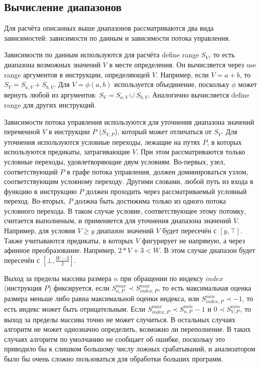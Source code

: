 \subsection{Вычисление диапазонов}

Для расчёта описанных выше диапазонов рассматриваются два вида
зависимостей: зависимости по данным и зависимости потока управления.

Зависимости по данным используются для расчёта define range $S_V$, то
есть диапазона возможных значений $V$ в месте определения. Он
вычисляется через use range аргументов в инструкции, определяющей
$V$. Например, если $V = a + b$, то $S_V = S_{a, V} + S_{b, V}$. Для
$V = \phi(a, b)$ используется объединение, поскольку $\phi$ может
вернуть любой из аргументов: $S_V = S_{a, V} \cup S_{b, V}$. Аналогично
вычисляется define range для других инструкций.

Зависимости потока управления используются для уточнения диапазона
значений переменной $V$ в инструкции $P$ ($S_{V, P}$), который может
отличаться от $S_V$. Для уточнения используются условные переходы,
лежащие на путях $P$, в которых используются предикаты, затрагивающие
$V$. При этом рассматриваются только условные переходы,
удовлетворяющие двум условиям. Во-первых, узел, соответствующий $P$ в
графе потока управления, должен доминироваться узлом, соответствующим
условному переходу. Другими словами, любой путь из входа в функцию в
инструкцию $P$ должен проходить через рассматриваемый условный
переход. Во-вторых, $P$ должна быть достижима только из одного потока
условного перехода. В таком случае условие, соответствующее этому
потомку, считается выполненым, и применяется для уточнения диапазона
значений $V$. Например, для условия $V \geq y$ диапазон значений $V$
будет пересечён с $[y, \top]$. Также учитываются предикаты, в которых
$V$ фигурирует не напрямую, а через афинное преобразование. Например,
$2 * V + 3 < W$. В этом случае диапазон будет пересечён с $[\bot,
\frac{W - 3}{2}]$.

Выход за пределы массива размера $n$ при обращении по индексу $index$
(инструкция $P$) фиксируется, если
$S_{n, P}^{max} \prec S_{index, P}^{max}$, то есть максимальная оценка
размера меньше либо равна максимальной оценки индекса, или
$S_{index, P}^{min} \prec -1$, то есть индекс может быть
отрицательным. Если $S_{index, P}^{max} \prec S_{n, P}^{min} - 1$ и
$0 \prec S_{V, P}^{min}$, то выход за пределы массива точно не может
случиться. В остальных случаях алгоритм не может однозначно
определить, возможно ли переполнение. В таких случаях алгоритм по
умолчанию не сообщает об ошибке, поскольку это приводило бы к слишком
большому числу ложных срабатываний, и анализатором было бы очень
сложно пользоваться для обработки больших программ.

